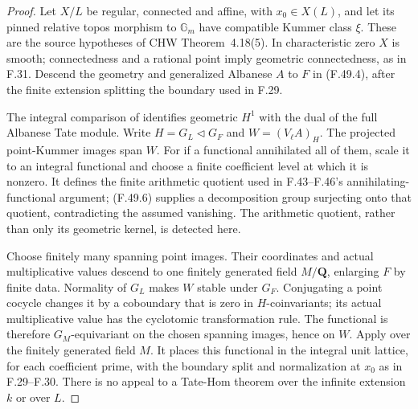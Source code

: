 \begin{proof}
Let \(X/L\) be regular, connected and affine, with
\(x_0\in X(L)\), and let its pinned relative topos morphism to
\(\mathbb G_m\) have compatible Kummer class \(\xi\).
These are the source hypotheses of CHW Theorem~4.18(5).
In characteristic zero \(X\) is smooth; connectedness and a
rational point imply geometric connectedness, as in F.31.
Descend the geometry and generalized Albanese \(A\) to \(F\)
in (F.49.4), after the finite extension splitting the boundary
used in F.29.

The integral comparison of
\citet[Proposition~4.1, Corollary~4.2 and Proposition~4.3]{F_SpiessSzamuely2003}
identifies geometric \(H^1\) with the dual of the full Albanese
Tate module. Write \(H=G_L\triangleleft G_F\) and
\(W=(V_\ell A)_H\).
The projected point-Kummer images span \(W\).
For if a functional annihilated all of them, scale it to an
integral functional and choose a finite coefficient level at
which it is nonzero. It defines the finite arithmetic quotient
used in F.43--F.46's annihilating-functional argument;
(F.49.6) supplies a decomposition group surjecting onto that
quotient, contradicting the assumed vanishing.
The arithmetic quotient, rather than only its geometric kernel,
is detected here.

Choose finitely many spanning point images. Their coordinates
and actual multiplicative values descend to one finitely
generated field \(M/\mathbf Q\), enlarging \(F\) by finite data.
Normality of \(G_L\) makes \(W\) stable under \(G_F\).
Conjugating a point cocycle changes it by a coboundary that is
zero in \(H\)-coinvariants; its actual multiplicative value has
the cyclotomic transformation rule. The functional is therefore
\(G_M\)-equivariant on the chosen spanning images, hence on \(W\).
Apply \citet[Theorem~4.3(ii), p.~676]{F_Jannsen1995} over the
finitely generated field \(M\). It places this functional in the
integral unit lattice, for each coefficient prime, with the
boundary split and normalization at \(x_0\) as in F.29--F.30.
There is no appeal to a Tate-Hom theorem over the infinite
extension \(k\) or over \(L\).


\end{proof}
